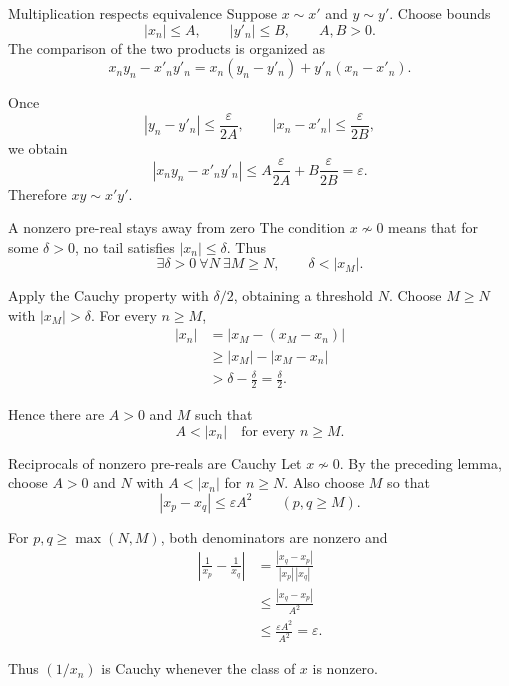 \documentclass[aspectratio=169,11pt]{beamer}
\begin{document}
\begin{frame}{Multiplication respects equivalence}
  Suppose \(x\sim x'\) and \(y\sim y'\).  Choose bounds
  \[
    |x_n|\le A,
    \qquad
    |y'_n|\le B,
    \qquad A,B>0.
  \]
  The comparison of the two products is organized as
  \[
    x_ny_n-x'_ny'_n
      =x_n(y_n-y'_n)+y'_n(x_n-x'_n).
  \]

  Once
  \[
    |y_n-y'_n|\le\frac\varepsilon{2A},
    \qquad
    |x_n-x'_n|\le\frac\varepsilon{2B},
  \]
  we obtain
  \[
    |x_ny_n-x'_ny'_n|
      \le A\frac\varepsilon{2A}+B\frac\varepsilon{2B}
      =\varepsilon.
  \]
  Therefore \(xy\sim x'y'\).
\end{frame}

\begin{frame}{A nonzero pre-real stays away from zero}
  The condition \(x\not\sim0\) means that for some \(\delta>0\), no tail
  satisfies \(|x_n|\le\delta\).  Thus
  \[
    \exists\delta>0\ \forall N\ \exists M\ge N,
    \qquad \delta<|x_M|.
  \]

  Apply the Cauchy property with \(\delta/2\), obtaining a threshold \(N\).
  Choose \(M\ge N\) with \(|x_M|>\delta\).  For every \(n\ge M\),
  \begin{align*}
    |x_n|
      &=|x_M-(x_M-x_n)|\\
      &\ge |x_M|-|x_M-x_n|\\
      &>\delta-\frac\delta2=\frac\delta2.
  \end{align*}

  Hence there are \(A>0\) and \(M\) such that
  \[
    \boxed{A<|x_n|\quad\text{for every }n\ge M.}
  \]
\end{frame}

\begin{frame}{Reciprocals of nonzero pre-reals are Cauchy}
  Let \(x\not\sim0\).  By the preceding lemma, choose \(A>0\) and \(N\) with
  \(A<|x_n|\) for \(n\ge N\).  Also choose \(M\) so that
  \[
    |x_p-x_q|\le\varepsilon A^2
    \qquad(p,q\ge M).
  \]

  For \(p,q\ge\max(N,M)\), both denominators are nonzero and
  \begin{align*}
    \left|\frac1{x_p}-\frac1{x_q}\right|
      &=\frac{|x_q-x_p|}{|x_p|\,|x_q|}\\
      &\le\frac{|x_q-x_p|}{A^2}\\
      &\le\frac{\varepsilon A^2}{A^2}=\varepsilon.
  \end{align*}

  Thus \((1/x_n)\) is Cauchy whenever the class of \(x\) is nonzero.
\end{frame}
\end{document}
